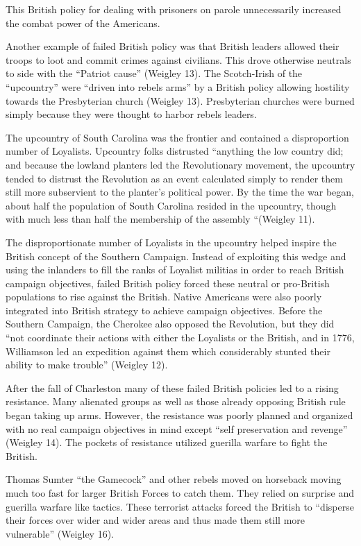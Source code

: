 This British policy for dealing with prisoners on parole unnecessarily increased the combat power of the Americans.  

Another example of failed British policy was that British leaders allowed their troops to loot and commit crimes against civilians.  This drove otherwise neutrals to side with the ``Patriot cause'' (Weigley 13).   The Scotch-Irish of the ``upcountry'' were ``driven into rebels arms'' by a British policy allowing hostility towards the Presbyterian church (Weigley 13).  Presbyterian churches were burned simply because they were thought to harbor rebels leaders. 

The upcountry of South Carolina was the frontier and contained a disproportion number of Loyalists.  Upcountry folks distrusted ``anything the low country did; and because the lowland planters led the Revolutionary movement, the upcountry tended to distrust the Revolution as an event calculated simply to render them still more subservient to the planter's political power.  By the time the war began, about half the population of South Carolina resided in the upcountry, though with much less than half the membership of the assembly ``(Weigley 11).  

The disproportionate number of Loyalists in the upcountry helped inspire the British concept of the Southern Campaign.  Instead of exploiting this wedge and using the inlanders to fill the ranks of Loyalist militias in order to reach British campaign objectives, failed British policy forced these neutral or pro-British populations to rise against the British.  Native Americans were also poorly integrated into British strategy to achieve campaign objectives.  Before the Southern Campaign, the Cherokee also opposed the Revolution, but they did ``not coordinate their actions with either the Loyalists or the British, and in 1776, Williamson led an expedition against them which considerably stunted their ability to make trouble'' (Weigley 12).

After the fall of Charleston many of these failed British policies led to a rising resistance.  Many alienated groups as well as those already opposing British rule began taking up arms.  However, the resistance was poorly planned and organized with no real campaign objectives in mind except  ``self preservation and revenge'' (Weigley 14).  The pockets of resistance utilized guerilla warfare to fight the British.  

Thomas Sumter ``the Gamecock'' and other rebels moved on horseback moving much too fast for larger British Forces to catch them.  They relied on surprise and guerilla warfare like tactics.  These terrorist attacks forced the British to ``disperse their forces over wider and wider areas and thus made them still more vulnerable'' (Weigley 16).

